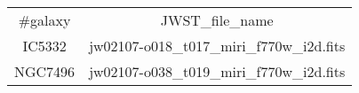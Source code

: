 \begin{table}
\begin{tabular}{cc}
#galaxy & JWST_file_name \\
IC5332 & jw02107-o018_t017_miri_f770w_i2d.fits \\
NGC7496 & jw02107-o038_t019_miri_f770w_i2d.fits \\
\end{tabular}
\end{table}
